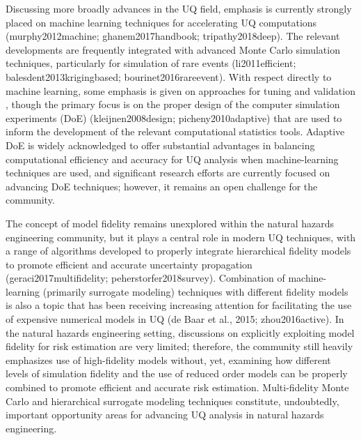 Discussing more broadly advances in the UQ field, emphasis is currently strongly placed on machine learning techniques for accelerating UQ computations (murphy2012machine; ghanem2017handbook; tripathy2018deep). The relevant developments are frequently integrated with advanced Monte Carlo simulation techniques, particularly for simulation of rare events (li2011efficient; balesdent2013krigingbased; bourinet2016rareevent). With respect directly to machine learning, some emphasis is given on approaches for tuning and validation \citep{mehmani2018concurrent}, though the primary focus is on the proper design of the computer simulation experiments (DoE) (kleijnen2008design; picheny2010adaptive) that are used to inform the development of the relevant computational statistics tools. Adaptive DoE is widely acknowledged to offer substantial advantages in balancing computational efficiency and accuracy for UQ analysis when machine-learning techniques are used, and significant research efforts are currently focused on advancing DoE techniques; however, it remains an open challenge for the community. 

The concept of model fidelity remains unexplored within the natural hazards engineering community, but it plays a central role in modern UQ techniques, with a range of algorithms developed to properly integrate hierarchical fidelity models to promote efficient and accurate uncertainty propagation (geraci2017multifidelity; peherstorfer2018survey). Combination of machine-learning (primarily surrogate modeling) techniques with different fidelity models is also a topic that has been receiving increasing attention for facilitating the use of expensive numerical models in UQ (de Baar et al., 2015; zhou2016active). In the natural hazards engineering setting, discussions on explicitly exploiting model fidelity for risk estimation are very limited; therefore, the community still heavily emphasizes use of high-fidelity models without, yet, examining how different levels of simulation fidelity and the use of reduced order models can be properly combined to promote efficient and accurate risk estimation. Multi-fidelity Monte Carlo and hierarchical surrogate modeling techniques constitute, undoubtedly, important opportunity areas for advancing UQ analysis in natural hazards engineering.

